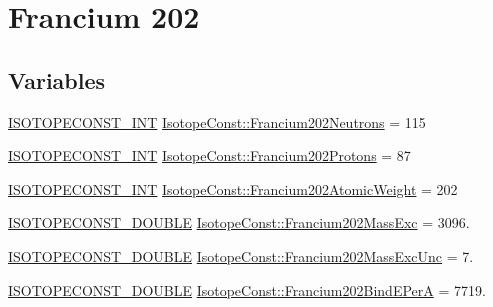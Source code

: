 \hypertarget{group___isotope_const-_francium-_fr202}{}\section{Francium 202}
\label{group___isotope_const-_francium-_fr202}
\subsection*{Variables}
\begin{DoxyCompactItemize}
\item 
\mbox{\hyperlink{group___isotope_const-_macros_ga5f18360b3e99483a35c32d789e62621c}{I\+S\+O\+T\+O\+P\+E\+C\+O\+N\+S\+T\+\_\+\+I\+NT}} \mbox{\hyperlink{group___isotope_const-_francium-_fr202_gac6907e010d538991cb6fd3de9066744b}{Isotope\+Const\+::\+Francium202\+Neutrons}} = 115
\item 
\mbox{\hyperlink{group___isotope_const-_macros_ga5f18360b3e99483a35c32d789e62621c}{I\+S\+O\+T\+O\+P\+E\+C\+O\+N\+S\+T\+\_\+\+I\+NT}} \mbox{\hyperlink{group___isotope_const-_francium-_fr202_ga05e22aa473de4684683be09cf246ef43}{Isotope\+Const\+::\+Francium202\+Protons}} = 87
\item 
\mbox{\hyperlink{group___isotope_const-_macros_ga5f18360b3e99483a35c32d789e62621c}{I\+S\+O\+T\+O\+P\+E\+C\+O\+N\+S\+T\+\_\+\+I\+NT}} \mbox{\hyperlink{group___isotope_const-_francium-_fr202_gad070fcd23b8acb40490538bfe7f4297c}{Isotope\+Const\+::\+Francium202\+Atomic\+Weight}} = 202
\item 
\mbox{\hyperlink{group___isotope_const-_macros_ga8f45a7272ce02c0b4c65c44636ed719a}{I\+S\+O\+T\+O\+P\+E\+C\+O\+N\+S\+T\+\_\+\+D\+O\+U\+B\+LE}} \mbox{\hyperlink{group___isotope_const-_francium-_fr202_ga71665cc48bbb426812f4501c478b1c35}{Isotope\+Const\+::\+Francium202\+Mass\+Exc}} = 3096.
\item 
\mbox{\hyperlink{group___isotope_const-_macros_ga8f45a7272ce02c0b4c65c44636ed719a}{I\+S\+O\+T\+O\+P\+E\+C\+O\+N\+S\+T\+\_\+\+D\+O\+U\+B\+LE}} \mbox{\hyperlink{group___isotope_const-_francium-_fr202_gafe4e1af47b4030a793ed53326c72542a}{Isotope\+Const\+::\+Francium202\+Mass\+Exc\+Unc}} = 7.
\item 
\mbox{\hyperlink{group___isotope_const-_macros_ga8f45a7272ce02c0b4c65c44636ed719a}{I\+S\+O\+T\+O\+P\+E\+C\+O\+N\+S\+T\+\_\+\+D\+O\+U\+B\+LE}} \mbox{\hyperlink{group___isotope_const-_francium-_fr202_ga3b8fc8e47a97498c5f0425bc4bf92dfa}{Isotope\+Const\+::\+Francium202\+Bind\+E\+PerA}} = 7719.
\item 

\end{DoxyCompactItemize}
